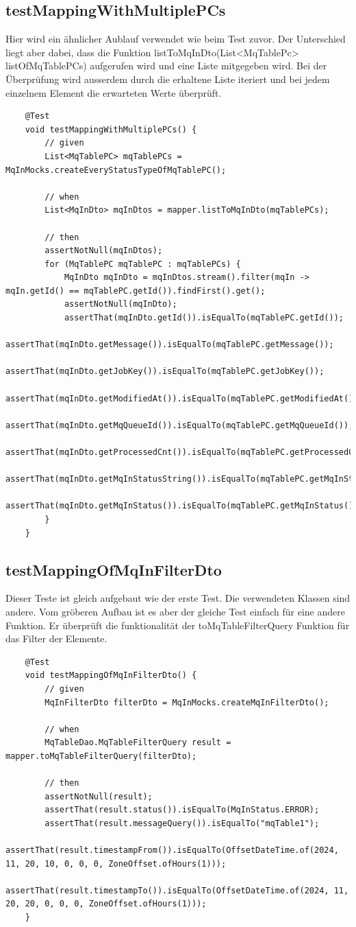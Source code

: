 \subsection{testMappingWithMultiplePCs}
Hier wird ein ähnlicher Aublauf verwendet wie beim Test zuvor. Der Unterschied liegt aber dabei, dass die Funktion listToMqInDto(List<MqTablePc> listOfMqTablePCs) aufgerufen wird und eine Liste mitgegeben wird. Bei der Überprüfung wird ausserdem durch die erhaltene Liste iteriert und bei jedem einzelnem Element die erwarteten Werte überprüft.

\begin{verbatim}
	@Test
	void testMappingWithMultiplePCs() {
		// given
		List<MqTablePC> mqTablePCs = MqInMocks.createEveryStatusTypeOfMqTablePC();
		
		// when
		List<MqInDto> mqInDtos = mapper.listToMqInDto(mqTablePCs);
		
		// then
		assertNotNull(mqInDtos);
		for (MqTablePC mqTablePC : mqTablePCs) {
			MqInDto mqInDto = mqInDtos.stream().filter(mqIn -> mqIn.getId() == mqTablePC.getId()).findFirst().get();
			assertNotNull(mqInDto);
			assertThat(mqInDto.getId()).isEqualTo(mqTablePC.getId());
			assertThat(mqInDto.getMessage()).isEqualTo(mqTablePC.getMessage());
			assertThat(mqInDto.getJobKey()).isEqualTo(mqTablePC.getJobKey());
			assertThat(mqInDto.getModifiedAt()).isEqualTo(mqTablePC.getModifiedAt());
			assertThat(mqInDto.getMqQueueId()).isEqualTo(mqTablePC.getMqQueueId());
			assertThat(mqInDto.getProcessedCnt()).isEqualTo(mqTablePC.getProcessedCnt());
			assertThat(mqInDto.getMqInStatusString()).isEqualTo(mqTablePC.getMqInStatusString());
			assertThat(mqInDto.getMqInStatus()).isEqualTo(mqTablePC.getMqInStatus());
		}
	}
\end{verbatim}

\subsection{testMappingOfMqInFilterDto}
Dieser Teste ist gleich aufgebaut wie der erste Test. Die verwendeten Klassen sind andere. Vom gröberen Aufbau ist es aber der gleiche Test einfach für eine andere Funktion. Er überprüft die funktionalität der toMqTableFilterQuery Funktion für das Filter der Elemente.

\begin{verbatim}
	@Test
	void testMappingOfMqInFilterDto() {
		// given
		MqInFilterDto filterDto = MqInMocks.createMqInFilterDto();
		
		// when
		MqTableDao.MqTableFilterQuery result = mapper.toMqTableFilterQuery(filterDto);
		
		// then
		assertNotNull(result);
		assertThat(result.status()).isEqualTo(MqInStatus.ERROR);
		assertThat(result.messageQuery()).isEqualTo("mqTable1");
		assertThat(result.timestampFrom()).isEqualTo(OffsetDateTime.of(2024, 11, 20, 10, 0, 0, 0, ZoneOffset.ofHours(1)));
		assertThat(result.timestampTo()).isEqualTo(OffsetDateTime.of(2024, 11, 20, 20, 0, 0, 0, ZoneOffset.ofHours(1)));
	}
\end{verbatim}


